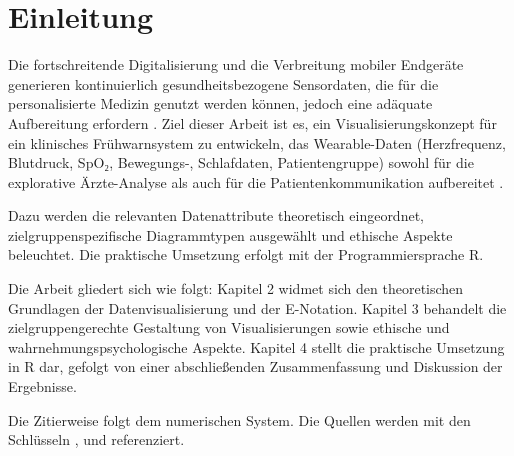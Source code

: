 

\section{Einleitung}

Die fortschreitende Digitalisierung und die Verbreitung mobiler Endgeräte generieren kontinuierlich gesundheitsbezogene Sensordaten, die für die personalisierte Medizin genutzt werden können, jedoch eine adäquate Aufbereitung erfordern \cite[4]{2}\cite[1]{3}. Ziel dieser Arbeit ist es, ein Visualisierungskonzept für ein klinisches Frühwarnsystem zu entwickeln, das Wearable-Daten (Herzfrequenz, Blutdruck, SpO₂, Bewegungs-, Schlafdaten, Patientengruppe) sowohl für die explorative Ärzte-Analyse als auch für die Patientenkommunikation aufbereitet \cite[8]{2}.

Dazu werden die relevanten Datenattribute theoretisch eingeordnet, zielgruppenspezifische Diagrammtypen ausgewählt und ethische Aspekte beleuchtet. Die praktische Umsetzung erfolgt mit der Programmiersprache R.

Die Arbeit gliedert sich wie folgt: Kapitel 2 widmet sich den theoretischen Grundlagen der Datenvisualisierung und der E-Notation. Kapitel 3 behandelt die zielgruppengerechte Gestaltung von Visualisierungen sowie ethische und wahrnehmungspsychologische Aspekte. Kapitel 4 stellt die praktische Umsetzung in R dar, gefolgt von einer abschließenden Zusammenfassung und Diskussion der Ergebnisse.

Die Zitierweise folgt dem numerischen System. Die Quellen werden mit den Schlüsseln \cite{1}, \cite{2} und \cite{3} referenziert.

